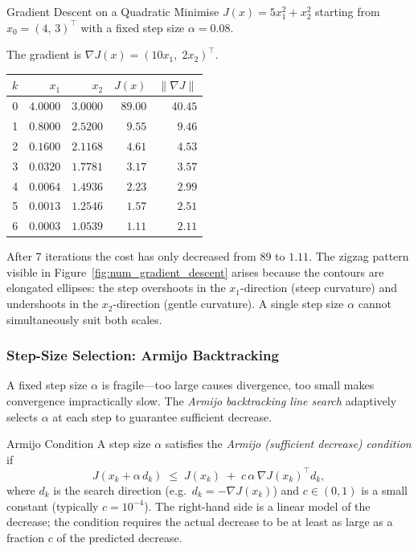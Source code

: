 \begin{examplebox}{Gradient Descent on a Quadratic}
	Minimise $J(x)=5x_1^2+x_2^2$ starting from $x_0=(4,\,3)^\top$ with a fixed step size $\alpha=0.08$.

	The gradient is $\nabla J(x)=(10x_1,\;2x_2)^\top$.

	\solution

	\begin{center}
	\renewcommand{\arraystretch}{1.15}
	\begin{tabular}{c r r r r}
		\toprule
		$k$ & $x_1$ & $x_2$ & $J(x)$ & $\|\nabla J\|$ \\
		\midrule
		0 & $4.0000$ & $3.0000$ & $89.00$ & $40.45$ \\
		1 & $0.8000$ & $2.5200$ & $9.55$ & $9.46$ \\
		2 & $0.1600$ & $2.1168$ & $4.61$ & $4.53$ \\
		3 & $0.0320$ & $1.7781$ & $3.17$ & $3.57$ \\
		4 & $0.0064$ & $1.4936$ & $2.23$ & $2.99$ \\
		5 & $0.0013$ & $1.2546$ & $1.57$ & $2.51$ \\
		6 & $0.0003$ & $1.0539$ & $1.11$ & $2.11$ \\
		\bottomrule
	\end{tabular}
	\end{center}

	After 7 iterations the cost has only decreased from $89$ to $1.11$. The zigzag pattern visible in Figure~\ref{fig:num_gradient_descent} arises because the contours are elongated ellipses: the step overshoots in the $x_1$-direction (steep curvature) and undershoots in the $x_2$-direction (gentle curvature). A single step size $\alpha$ cannot simultaneously suit both scales.
\end{examplebox}

\subsubsection{Step-Size Selection: Armijo Backtracking}

A fixed step size $\alpha$ is fragile---too large causes divergence, too small makes convergence impractically slow. The \emph{Armijo backtracking line search} adaptively selects $\alpha$ at each step to guarantee sufficient decrease.

\begin{defnbox}{Armijo Condition}
	A step size $\alpha$ satisfies the \emph{Armijo (sufficient decrease) condition} if
	\[
	J(x_k + \alpha\, d_k) \;\le\; J(x_k) \;+\; c\,\alpha\,\nabla J(x_k)^\top d_k,
	\]
	where $d_k$ is the search direction (e.g.\ $d_k=-\nabla J(x_k)$) and $c\in(0,1)$ is a small constant (typically $c=10^{-4}$). The right-hand side is a linear model of the decrease; the condition requires the actual decrease to be at least as large as a fraction $c$ of the predicted decrease.
\end{defnbox}

